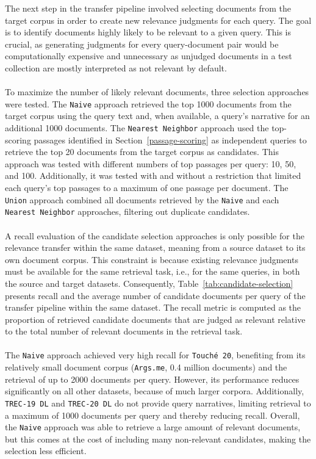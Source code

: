\begin{table}[t]
{\begin{tabular}{ccrcrcrcrcrcrcr}
        \bottomrule 
    \end{tabular}}
    \renewcommand{\arraystretch}{1.0}
\end{table}

The next step in the transfer pipeline involved selecting documents from the target corpus in order to create new relevance judgments for each query. The goal is to identify documents highly likely to be relevant to a given query. This is crucial, as generating judgments for every query-document pair would be computationally expensive and unnecessary as unjudged documents in a test collection are mostly interpreted as not relevant by default.
\\\\
To maximize the number of likely relevant documents, three selection approaches were tested. The \texttt{Naive} approach retrieved the top 1000 documents from the target corpus using the query text and, when available, a query's narrative for an additional 1000 documents. The \texttt{Nearest Neighbor} approach used the top-scoring passages identified in Section~\ref{passage-scoring} as independent queries to retrieve the top 20 documents from the target corpus as candidates. This approach was tested with different numbers of top passages per query: 10, 50, and 100. Additionally, it was tested with and without a restriction that limited each query's top passages to a maximum of one passage per document. The \texttt{Union} approach combined all documents retrieved by the \texttt{Naive} and each \texttt{Nearest Neighbor} approaches, filtering out duplicate candidates.
\\\\
A recall evaluation of the candidate selection approaches is only possible for the relevance transfer within the same dataset, meaning from a source dataset to its own document corpus. This constraint is because existing relevance judgments must be available for the same retrieval task, i.e., for the same queries, in both the source and target datasets. Consequently, Table~\ref{tab:candidate-selection} presents recall and the average number of candidate documents per query of the transfer pipeline within the same dataset. The recall metric is computed as the proportion of retrieved candidate documents that are judged as relevant relative to the total number of relevant documents in the retrieval task.
\\\\
The \texttt{Naive} approach achieved very high recall for \texttt{Touché 20}, benefiting from its relatively small document corpus (\texttt{Args.me}, 0.4 million documents) and the retrieval of up to 2000 documents per query. However, its performance reduces significantly on all other datasets, because of much larger corpora. Additionally, \texttt{TREC-19 DL} and \texttt{TREC-20 DL} do not provide query narratives, limiting retrieval to a maximum of 1000 documents per query and thereby reducing recall. Overall, the \texttt{Naive} approach was able to retrieve a large amount of relevant documents, but this comes at the cost of including many non-relevant candidates, making the selection less efficient.

